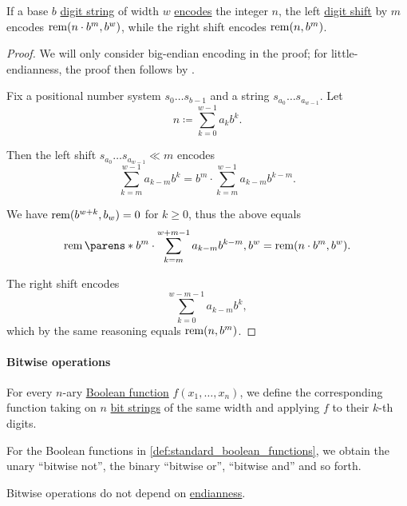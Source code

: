 \begin{proposition}\label{thm:digit_shift_arithmetic}
  If a base \( b \) \hyperref[def:positional_number_system]{digit string} of width \( w \) \hyperref[def:ring_of_unsigned_integers]{encodes} the integer \( n \), the left \hyperref[def:digit_shift]{digit shift} by \( m \) encodes \( \operatorname{rem}(n \cdot b^m, b^w) \), while the right shift encodes \( \operatorname{rem}(n, b^m) \).
\end{proposition}
\begin{proof}
  We will only consider big-endian encoding in the proof; for little-endianness, the proof then follows by .

  Fix a positional number system \( s_0 \ldots s_{b-1} \) and a string \( s_{a_0} \ldots s_{a_{w-1}} \). Let
  \begin{equation*}
    n \coloneqq \sum_{k=0}^{w-1} a_k b^k.
  \end{equation*}

  Then the left shift \( s_{a_0} \ldots s_{a_{w-1}} \ll m \) encodes
  \begin{equation*}
    \sum_{k=m}^{w-1} a_{k-m} b^k = b^m \cdot \sum_{k=m}^{w-1} a_{k-m} b^{k-m}.
  \end{equation*}

  We have \( \operatorname{rem}(b^{w+k}, b_w) = 0 \) for \( k \geq 0 \), thus the above equals
  \begin{equation*}
    \rem\parens*{ b^m \cdot \sum_{k=m}^{w+m-1} a_{k-m} b^{k-m}, b^w } = \rem(n \cdot b^m, b^w).
  \end{equation*}

  The right shift encodes
  \begin{equation*}
    \sum_{k=0}^{w-m-1} a_{k-m} b^k,
  \end{equation*}
  which by the same reasoning equals \( \operatorname{rem}(n, b^m) \).
\end{proof}

\paragraph{Bitwise operations}

\begin{definition}\label{def:bitwise_operations}
  For every \( n \)-ary \hyperref[def:boolean_function]{Boolean function} \( f(x_1, \ldots, x_n) \), we define the corresponding  function taking on \( n \) \hyperref[def:bit_string]{bit strings} of the same width and applying \( f \) to their \( k \)-th digits.
\end{definition}
\begin{comments}
  \item For the Boolean functions in \cref{def:standard_boolean_functions}, we obtain the unary \enquote{bitwise not}, the binary \enquote{bitwise or}, \enquote{bitwise and} and so forth.

  \item Bitwise operations do not depend on \hyperref[def:endianness]{endianness}.
\end{comments}

